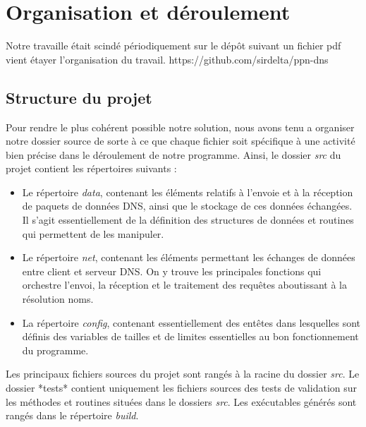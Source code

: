 \documentclass[12pt,a4paper]{article}
\begin{document}
\section{Organisation et déroulement}

Notre travaille était scindé périodiquement sur le dépôt suivant un fichier pdf vient étayer l'organisation du travail.
https://github.com/sirdelta/ppn-dns

\subsection{Structure du projet}

\quad Pour rendre le plus cohérent possible notre solution, nous avons tenu a organiser notre dossier source de sorte à ce que chaque fichier soit spécifique à une activité bien précise dans le déroulement de notre programme. Ainsi, le dossier \textit{src} du projet contient les répertoires suivants :
\begin{itemize}
    \item Le répertoire \textit{data}, contenant les éléments relatifs à l’envoie et à la réception de paquets de données DNS, ainsi que le stockage de ces données échangées. Il s’agit essentiellement de la définition des structures de données et routines qui permettent de les manipuler.
    \item Le répertoire \textit{net}, contenant les éléments permettant les échanges de données entre client et serveur DNS. On y trouve les principales fonctions qui orchestre l’envoi, la réception et le traitement des requêtes aboutissant à la résolution noms.
    \item La répertoire \textit{config}, contenant essentiellement des entêtes dans lesquelles sont définis des variables de tailles et de limites essentielles au bon fonctionnement du programme.
\end{itemize}

\quad Les principaux fichiers sources du projet sont rangés à la racine du dossier \textit{src}. Le dossier *tests* contient uniquement les fichiers sources des tests de validation sur les méthodes et routines situées dans le dossiers \textit{src}. Les exécutables générés sont rangés dans le répertoire \textit{build}.
\end{document}
